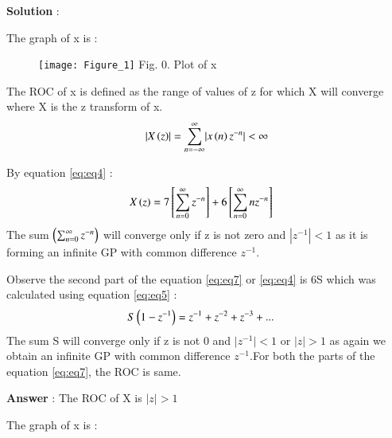 \documentclass[journal,12pt,twocolumn]{IEEEtran}
\theoremstyle{remark}
\begin{document}
\vspace{4mm}
\newpage
\large\textbf{Solution} :

\vspace{4mm}

\large\textbf{} \normalsize The graph of x is :
\begin{figure}[ht]
    \begin{center}
    \texttt{[image: Figure\_1]}
    Fig. 0. Plot of x \\
    \end{center}
\end{figure}

The ROC of x is defined as the range of values of z for which X will converge where X is the z transform of x.\\
\begin{align}
   \lvert X\left(z\right)\rvert = \sum_{n = -\infty}^{\infty}\lvert x\left(n\right)z^{-n}\rvert < \infty
\end{align}

By equation \eqref{eq:eq4} :\\
\begin{align}
X\left(z\right) &=  7{}\left[\sum_{n=0}^{\infty}z^{-n}\right] + 6{}\left[\sum_{n=0}^{\infty}nz^{-n}\right] \label{eq:eq7}
\end{align}
The sum $ \left(\sum_{n=0}^{\infty}z^{-n}\right) $ will converge only if z is not zero and $ |z^{-1}|< 1 $ as it is forming an infinite GP with common difference $z^{-1}$. 

Observe the second part of the equation \eqref{eq:eq7} or \eqref{eq:eq4} is 6S which was calculated using equation \eqref{eq:eq5} : \\
\begin{align}
    S\left(1-z^{-1}\right) &= z^{-1} + z^{-2} + z^{-3} + ... 
\end{align}
The sum S will converge only if z is not 0 and $\lvert z^{-1} \rvert < 1 $ or $ \lvert z \rvert > 1$ as again we obtain an infinite GP with common difference $z^{-1}$.For both the parts of the equation \eqref{eq:eq7}, the ROC is same.

\vspace{4mm}

\large\textbf{Answer} : \normalsize The ROC of X is  $\lvert z \rvert > 1$

\vspace{15mm}

\large\textbf{} \normalsize The graph of x is :
\end{document}
